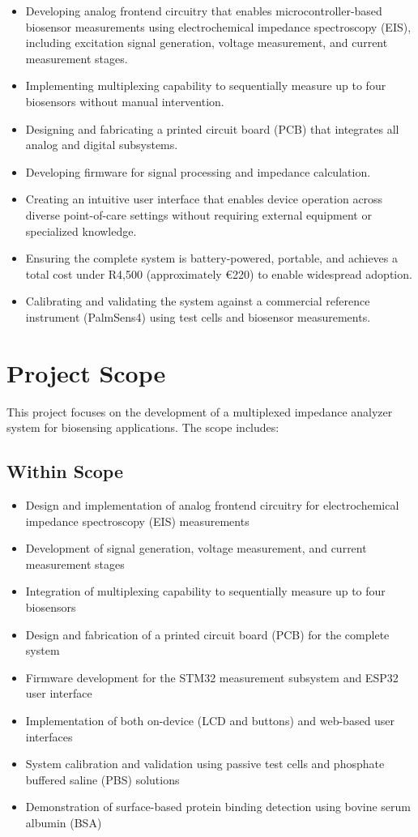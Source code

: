\begin{itemize}
    \item Developing analog frontend circuitry that enables microcontroller-based biosensor measurements using electrochemical impedance spectroscopy (EIS), including excitation signal generation, voltage measurement, and current measurement stages.
    \item Implementing multiplexing capability to sequentially measure up to four biosensors without manual intervention.
    \item Designing and fabricating a printed circuit board (PCB) that integrates all analog and digital subsystems.
    \item Developing firmware for signal processing and impedance calculation.
    \item Creating an intuitive user interface that enables device operation across diverse point-of-care settings without requiring external equipment or specialized knowledge.
    \item Ensuring the complete system is battery-powered, portable, and achieves a total cost under R4,500 (approximately €220) to enable widespread adoption.
    \item Calibrating and validating the system against a commercial reference instrument (PalmSens4) using test cells and biosensor measurements.
\end{itemize}

\section{Project Scope}

This project focuses on the development of a multiplexed impedance analyzer system for biosensing applications. The scope includes:

\subsection{Within Scope}
\begin{itemize}
    \item Design and implementation of analog frontend circuitry for electrochemical impedance spectroscopy (EIS) measurements
    \item Development of signal generation, voltage measurement, and current measurement stages
    \item Integration of multiplexing capability to sequentially measure up to four biosensors
    \item Design and fabrication of a printed circuit board (PCB) for the complete system
    \item Firmware development for the STM32 measurement subsystem and ESP32 user interface
    \item Implementation of both on-device (LCD and buttons) and web-based user interfaces
    \item System calibration and validation using passive test cells and phosphate buffered saline (PBS) solutions
    \item Demonstration of surface-based protein binding detection using bovine serum albumin (BSA)
\end{itemize}

